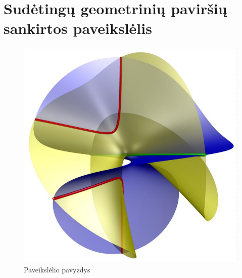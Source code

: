 \documentclass[12pt, a4paper, lithuanian]{article}
\begin{document}
\pagebreak

\section{Sudėtingų geometrinių paviršių sankirtos paveikslėlis}
\begin{figure}[H]
    \centering
\includegraphics[scale=0.13]{img/cones}
\caption{Paveikslėlio pavyzdys}
\end{figure}
\end{document}
